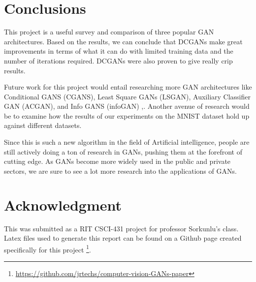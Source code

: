 \documentclass[12pt,
 reprint,
nofootinbib,
 amsmath,amssymb,
 aps,
floatfix,
]{revtex4-2}
\begin{document}




\section{\label{sec:exp}Conclusions}


This project is a useful survey and comparison of three popular GAN architectures. Based on the results, we can conclude that DCGANs make great improvements in terms of what it can do with limited training data and the number of iterations required. DCGANs were also proven to give really crip results.

Future work for this project would entail researching more GAN architectures like Conditional GANS (CGANS), Least Square GANs (LSGAN), Auxiliary Classifier GAN (ACGAN), and Info GANS (infoGAN) \cite{cGAN, lsgan, acgan, infogan},. Another avenue of research would be to examine how the results of our experiments on the MNIST dataset hold up against different datasets. 

Since this is such a new algorithm in the field of Artificial intelligence, people are still actively doing a ton of research in GANs, pushing them at the forefront of cutting edge. As GANs become more widely used in the public and private sectors, we are sure to see a lot more research into the applications of GANs.

\section{Acknowledgment}

This was submitted as a RIT CSCI-431 project for professor Sorkunlu's class. Latex files used to generate this report can be found on a Github page created specifically for this project \footnote{\url{https://github.com/jrtechs/computer-vision-GANs-paper}}. 





\end{document}
